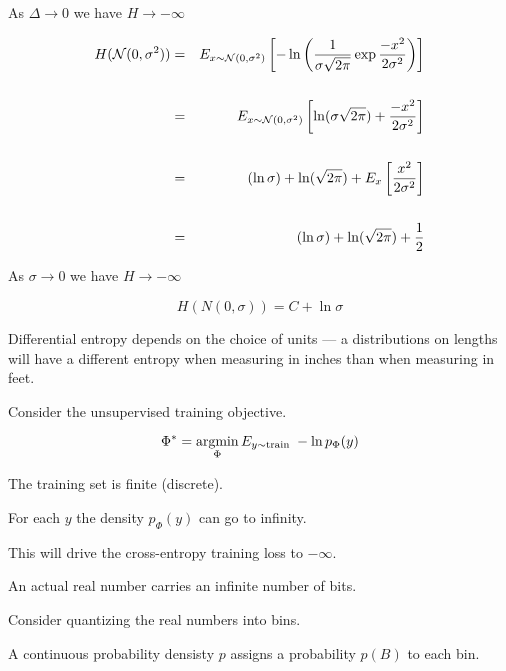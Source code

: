 {\vfill
\centerline{As $\Delta \rightarrow 0$ we have $H \rightarrow -\infty$}


\hfill

{\huge
\begin{eqnarray*}
H({\cal N}(0,\sigma^2)) & = & E_{x \sim {\cal N}(0,\sigma^2)} \left[ -\ln \left(\frac{1}{\sigma\sqrt{2\pi}} \exp{\frac{-x^2}{2\sigma^2}}\right)\right] \\
\\
& =& E_{x \sim {\cal N}(0,\sigma^2)} \left[ \ln (\sigma\sqrt{2\pi}) + \frac{-x^2}{2\sigma^2}\right] \\
\\
& = & (\ln\sigma) + \ln(\sqrt{2\pi}) + E_x \left[\frac{x^2}{2\sigma^2}\right] \\
\\
& = & (\ln\sigma) + \ln(\sqrt{2\pi}) + \frac{1}{2} \\
\end{eqnarray*}
}

\vfill
\centerline{As $\sigma \rightarrow 0$ we have $H \rightarrow -\infty$}


$$H(N(0,\sigma)) = C + \ln \sigma$$

\vfill
Differential entropy depends on the choice of units --- a distributions on lengths will have a different entropy
when measuring in inches than when measuring in feet.


Consider the unsupervised training objective.

$$\Phi^* = \operatorname*{argmin}_\Phi E_{y \sim \mathrm{train}}\;-\ln p_\Phi(y)$$

\vfill
The training set is finite (discrete).

\vfill
For each $y$ the density $p_\Phi(y)$ can go to infinity.

\vfill
This will drive the cross-entropy training loss to $-\infty$.



An actual real number carries an infinite number of bits.

\vfill
Consider quantizing the real numbers into bins.

\vfill
A continuous probability densisty $p$ assigns a probability $p(B)$ to each bin.

}
